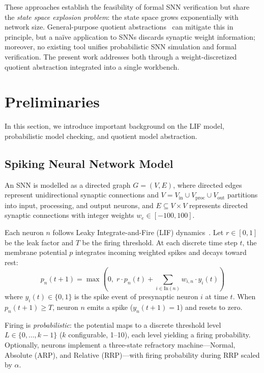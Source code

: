 \documentclass[runningheads]{llncs}
\begin{document}
These approaches establish the feasibility of formal SNN verification but share
the \emph{state space explosion problem}: the state space grows exponentially
with network size. General-purpose quotient abstractions~\cite{BaierKatoen2008}
can mitigate this in principle, but a naïve application to SNNs discards synaptic
weight information; moreover, no existing tool unifies probabilistic SNN
simulation and formal verification. The present work addresses both through a
weight-discretized quotient abstraction integrated into a single workbench.


\section{Preliminaries}\label{sec:prelim}

In this section, we introduce important background on the LIF model,
probabilistic model checking, and quotient model abstraction.

\subsection{Spiking Neural Network Model}\label{sec:snn-model}

An SNN is modelled as a directed graph $G = (V, E)$, where directed edges
represent unidirectional synaptic connections and
$V = V_{\mathrm{in}} \cup V_{\mathrm{proc}} \cup V_{\mathrm{out}}$ partitions
into input, processing, and output neurons, and $E \subseteq V \times V$
represents directed synaptic connections with integer weights
$w_e \in [-100, 100]$.

Each neuron $n$ follows Leaky Integrate-and-Fire (LIF)
dynamics~\cite{naco20,hodgkin1952quantitative}. Let $r \in [0,1]$ be the leak
factor and $T$ be the firing threshold. At each discrete time step $t$, the
membrane potential $p$ integrates incoming weighted spikes and decays toward
rest:
\begin{equation}\label{eq:lif}
p_n(t+1) = \max\!\left(0,\; r \cdot p_n(t)
  + \sum_{i \in \mathrm{In}(n)} w_{i,n} \cdot y_i(t)\right)
\end{equation}
where $y_i(t) \in \{0,1\}$ is the spike event of presynaptic neuron $i$ at time
$t$. When $p_n(t+1) \geq T$, neuron $n$ emits a spike ($y_n(t+1) = 1$) and resets
to zero.

Firing is \emph{probabilistic}: the potential maps to a discrete threshold level
$L \in \{0, \dots, k-1\}$ ($k$ configurable, 1--10), each level yielding a firing
probability. Optionally, neurons implement a three-state refractory
machine---Normal, Absolute (ARP), and Relative (RRP)---with firing probability
during RRP scaled by $\alpha$.
\end{document}
